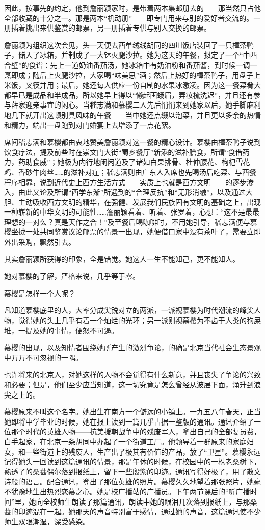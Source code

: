 \par 因此，按事先的约定，他到詹丽颖家时，是带着两本集邮册去的——那当然只占他全部收藏的十分之一。那是两本“机动册”——即专门用来与别的爱好者交流的。一册插着挑出来供鉴赏的邮票，另一册插着专供与别人交换的邮票。
\par 詹丽颖为组织这次会见，头一天便去西单绒线胡同的四川饭店装回了一只樟茶鸭子，储入了冰箱，并制成了一大钵火腿沙拉。她为这天的午餐，拟定了一个“中西合璧”的食谱：先上一道奶油番茄汤，她冰箱中有奶油粉和番茄酱，到时候一调一烹即成；随后上火腿沙拉，大家喝“味美思”酒；然后上热好的樟茶鸭子，用盘子上米饭，叉筷并用；最后，她还每人供应一份自制的水果冰激凌。因为这一餐菜肴大都早已是成品和半成品，所以她早上得以“懒起画蛾眉，弄妆梳洗迟”，并且还有参与薛家迎亲事宜的闲心。当嵇志满和慕樱二人先后悄悄来到她家以后，她手脚麻利地几下就开出这顿别具风味的午餐——当中她还点缀以泡菜，并且更以多余的热情和精力，端出一盘跑到对门婚宴上去增添了一点花絮。
\par 席间嵇志满和慕樱都由衷地赞美詹丽颖对这一餐的精心设计。慕樱由樟茶鸭子说到饮食疗法，提及前些时在崇文门大街“蜀乡餐厅”新添的滋补膳食，所谓“食借药力，药助食威”；她极为内行地闲闲道及了诸如白果排骨、杜仲腰花、枸杞雪花鸡、香砂牛肉丝……的滋补对症；嵇志满则由广东人入席也先喝汤后吃菜、与西餐程序相靠，说到近代史上西方生活方式——实质上也就是西方文明——的逐步渗入，由此又论及所谓“西学东渐”所遇到的“合理反抗”和“无形消融”，以及通过大胆、主动吸收西方文明的精华，在强健、发展我们民族固有文明的基础之上，出现一种崭新的中华文明的可能性……詹丽颖看着、听着、张罗着，心想：“这不是最最理想的一对么？真是天作之合！”及至餐后喝咖啡时，不用她引导，嵇志满便与慕樱坐拢一处共同鉴赏议论邮票的情景一出现，她便借口家中没有茶叶了，需要立即外出采购，飘然引去。
\par 其实詹丽颖所获得的印象，全是错觉。她这人一生不能知己，更不能知人。
\par 她对慕樱的了解，严格来说，几乎等于零。
\par 慕樱是怎样一个人呢？
\par 凡知道慕樱底里的人，大率分成尖锐对立的两派，一派视慕樱为时代潮流的峰尖人物，觉得她的头上几乎有着一个灿烂的光环；另一派则视慕樱为不齿于人类的狗屎堆，一提及她的事情，便怒不可遏。
\par 慕樱的出现，以及知情者围绕她所产生的激烈争论，的确是北京当代社会生态景观中万万不可忽视的一隅。
\par 也许将来的北京人，对她这样的人物不会觉得有什么新意，并且丧失了争论的兴致和必要；但是，他们至少应当知道，这一切究竟是怎么曾经从波层下面，涌升到浪尖之上的。
\par 慕樱原来不叫这个名字。她出生在南方一个僻远的小镇上。一九五八年春天，正当她即将中学毕业的时候，她在报上读到一篇几乎占据一整版的通讯。通讯介绍了一位那个时代的英雄人物——抗美援朝战争中的残废军人，拿出自己的全部复员费，白手起家，在北京一条胡同中办起了一个街道工厂。他领导着一群原来的家庭妇女，和一些街道上的残废人，生产出了极其有价值的产品，放了“卫星”。慕樱永远记得她头一回读到这篇通讯的情景，那是午休的时候，在校园中的一株老桑树下，熟透了的桑葚偶尔落到报纸上，留下一些殷紫的印迹。通讯写得好极了，用了散文诗般的语言。配合通讯，登出了那位英雄的照片。慕樱久久地望着那张照片，她毫不犹豫地生出热烈恋慕之心。她是校广播站的广播员。下午两节课后的“听广播时间”里，她向全校师生朗读了那篇通讯，朗读中她的眼泪几次落到报纸上，与那桑葚的印迹混在一起。她那天的声音特别富于感情，通过她的声音，这篇通讯使不少师生双眼潮湿，深受感染。
